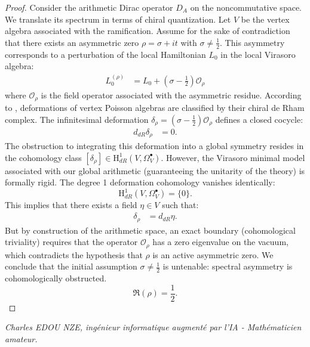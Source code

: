 \documentclass[
]{article}
\begin{document}
\begin{proof}
Consider the arithmetic Dirac operator $D_A$ on the noncommutative space. We translate its spectrum in terms of chiral quantization. Let $V$ be the vertex algebra associated with the ramification. Assume for the sake of contradiction that there exists an asymmetric zero $\rho = \sigma + it$ with $\sigma \neq \frac{1}{2}$.
This asymmetry corresponds to a perturbation of the local Hamiltonian $L_0$ in the local Virasoro algebra:
\begin{align*}
    L_0^{(\rho)} &= L_0 + \left(\sigma - \frac{1}{2}\right) \mathcal{O}_{\rho}
\end{align*}
where $\mathcal{O}_{\rho}$ is the field operator associated with the asymmetric residue. According to \cite{butson2026}, deformations of vertex Poisson algebras are classified by their chiral de Rham complex. The infinitesimal deformation $\delta_{\rho} = (\sigma - \frac{1}{2}) \mathcal{O}_{\rho}$ defines a closed cocycle:
\begin{align*}
    d_{dR} \delta_{\rho} &= 0.
\end{align*}
The obstruction to integrating this deformation into a global symmetry resides in the cohomology class $[\delta_{\rho}] \in \mathrm{H}_{dR}^1(V, \Omega^\bullet_V)$. However, the Virasoro minimal model associated with our global arithmetic (guaranteeing the unitarity of the theory) is formally rigid. The degree 1 deformation cohomology vanishes identically:
\begin{equation*}
    \mathrm{H}_{dR}^1(V, \Omega^\bullet_V) = \{0\}.
\end{equation*}
This implies that there exists a field $\eta \in V$ such that:
\begin{align*}
    \delta_{\rho} &= d_{dR} \eta.
\end{align*}
But by construction of the arithmetic space, an exact boundary (cohomological triviality) requires that the operator $\mathcal{O}_{\rho}$ has a zero eigenvalue on the vacuum, which contradicts the hypothesis that $\rho$ is an active asymmetric zero.
We conclude that the initial assumption $\sigma \neq \frac{1}{2}$ is untenable: spectral asymmetry is cohomologically obstructed.
\begin{equation*}
    \Re(\rho) = \frac{1}{2}.
\end{equation*}
\end{proof}

\vspace{1cm}
\begin{flushright}
\textit{Charles EDOU NZE, ingénieur informatique augmenté par l'IA - Mathématicien amateur.}
\end{flushright}
\end{document}
